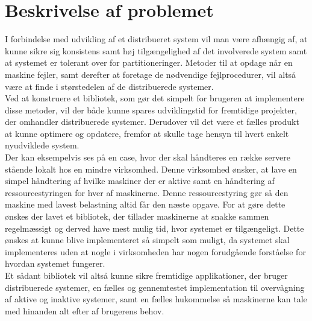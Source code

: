 \documentclass[a4paper,12pt]{article}
\begin{document}
\section{Beskrivelse af problemet}
I forbindelse med udvikling af et distribueret system vil man være afhængig af, at kunne sikre sig konsistens samt høj tilgængelighed af det involverede system samt at systemet er tolerant over for partitioneringer. Metoder til at opdage når en maskine fejler, samt derefter at foretage de nødvendige fejlprocedurer, vil altså være at finde i størstedelen af de distribuerede systemer.
\\
Ved at konstruere et bibliotek, som gør det simpelt for brugeren at implementere disse metoder, vil der både kunne spares udviklingstid for fremtidige projekter, der omhandler distribuerede systemer. Derudover vil det være et fælles produkt at kunne optimere og opdatere, fremfor at skulle tage hensyn til hvert enkelt nyudviklede system. 
\\[5px]
Der kan eksempelvis ses på en case, hvor der skal håndteres en række servere stående lokalt hos en mindre virksomhed. Denne virksomhed ønsker, at lave en simpel håndtering af hvilke maskiner der er aktive samt en håndtering af ressourcestyringen for hver af maskinerne. Denne ressourcestyring gør så den maskine med lavest belastning altid får den næste opgave. For at gøre dette ønskes der lavet et bibliotek, der tillader maskinerne at snakke sammen regelmæssigt og derved have mest mulig tid, hvor systemet er tilgængeligt. Dette ønskes at kunne blive implementeret så simpelt som muligt, da systemet skal implementeres uden at nogle i virksomheden har nogen forudgående forståelse for hvordan systemet fungerer.
\\[5px]
Et sådant bibliotek vil altså kunne sikre fremtidige applikationer, der bruger distribuerede systemer, en fælles og gennemtestet implementation til overvågning af aktive og inaktive systemer, samt en fælles hukommelse så maskinerne kan tale med hinanden alt efter af brugerens behov.
\end{document}
